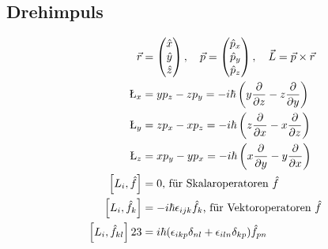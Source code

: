 \documentclass[landscape,8pt]{scrartcl}
\begin{document}
\begin{multicols}{3}
\subsection{Drehimpuls}
\begin{align*}
\vec r 	&= \begin{pmatrix}\hat x\\\hat y\\\hat z\end{pmatrix},
\quad \vec p 	= \begin{pmatrix}\hat p_x\\\hat p_y\\\hat p_z\end{pmatrix},
\quad \vec L = \vec p \times \vec r \\
%
\L_x 	&= yp_z - zp_y = -i\hbar \left( y\frac{\partial}{\partial z}-z\frac{\partial}{\partial y}\right) \\
%
\L_y 	&= zp_x - xp_z = -i\hbar \left( z\frac{\partial}{\partial x}-x\frac{\partial}{\partial z}\right) \\
%
\L_z 	&= xp_y - yp_x = -i\hbar \left( x\frac{\partial}{\partial y}-y\frac{\partial}{\partial x}\right)\\
\left[L_i,\hat f\right] &= 0 \text{, für Skalaroperatoren $\hat f$} \\
\left[L_i,\hat f_k\right] &= -i\hbar \epsilon_{ijk}\hat f_k \text{, für Vektoroperatoren $\hat f$} \\
\left[L_i,\hat f_{kl}\right]23 &= i\hbar (\epsilon_{ikp}\delta_{nl}+\epsilon_{iln}\delta_{kp})\hat f_{pn}
\end{align*}

 
 
 
\end{multicols}
\end{document}
